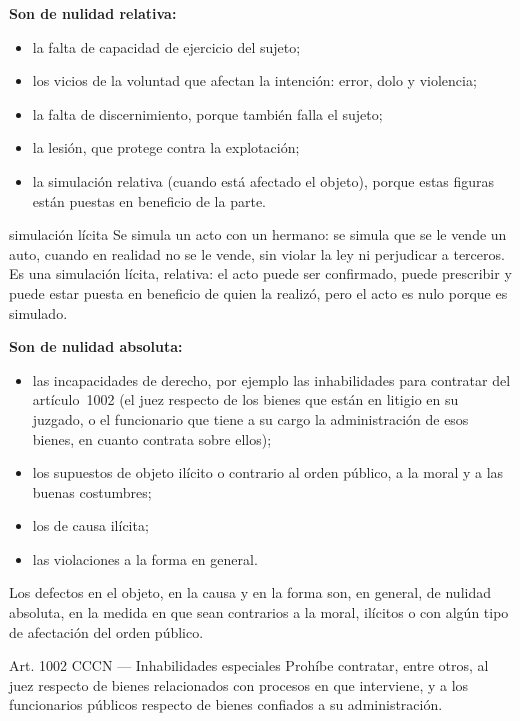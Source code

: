 \documentclass[12pt,oneside]{book}
\begin{document}
\textbf{Son de nulidad relativa:}
\begin{itemize}
    \item la falta de capacidad de ejercicio del sujeto;
    \item los vicios de la voluntad que afectan la intención: error, dolo y violencia;
    \item la falta de discernimiento, porque también falla el sujeto;
    \item la lesión, que protege contra la explotación;
    \item la simulación relativa (cuando está afectado el objeto), porque estas figuras están puestas en beneficio de la parte.
\end{itemize}

\begin{example}{simulación lícita}
Se simula un acto con un hermano: se simula que se le vende un auto, cuando en realidad no se le vende, sin violar la ley ni perjudicar a terceros. Es una simulación lícita, relativa: el acto puede ser confirmado, puede prescribir y puede estar puesta en beneficio de quien la realizó, pero el acto es nulo porque es simulado.
\end{example}

\textbf{Son de nulidad absoluta:}
\begin{itemize}
    \item las incapacidades de derecho, por ejemplo las inhabilidades para contratar del artículo~1002 (el juez respecto de los bienes que están en litigio en su juzgado, o el funcionario que tiene a su cargo la administración de esos bienes, en cuanto contrata sobre ellos);
    \item los supuestos de objeto ilícito o contrario al orden público, a la moral y a las buenas costumbres;
    \item los de causa ilícita;
    \item las violaciones a la forma en general.
\end{itemize}

Los defectos en el objeto, en la causa y en la forma son, en general, de nulidad absoluta, en la medida en que sean contrarios a la moral, ilícitos o con algún tipo de afectación del orden público.

\begin{articulo}{Art. 1002 CCCN --- Inhabilidades especiales}
Prohíbe contratar, entre otros, al juez respecto de bienes relacionados con procesos en que interviene, y a los funcionarios públicos respecto de bienes confiados a su administración.
\end{articulo}
\end{document}
